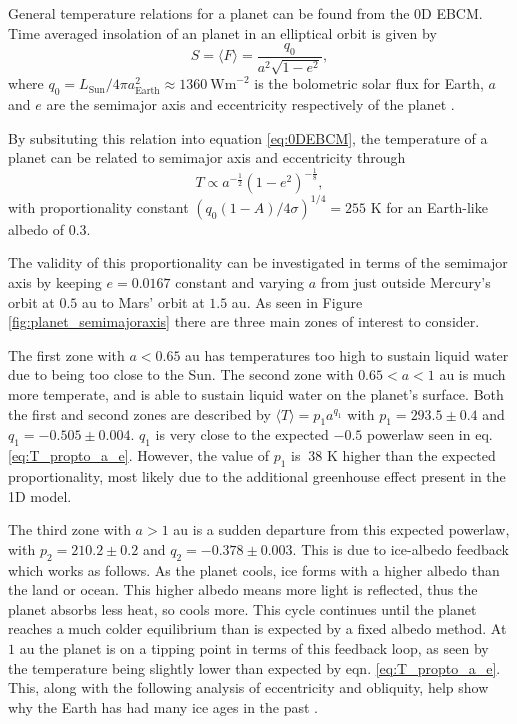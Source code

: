 \documentclass[12pt, onecolumn]{revtex4-2}    %
\begin{document}
General temperature relations for a planet can be found from the 0D EBCM.
Time averaged insolation of an planet in an elliptical orbit is given by
\begin{equation}
  S = \langle F \rangle = \frac{q_0}{a^2 \sqrt{1-e^2}} \label{eq:avgInsolation},
\end{equation}
where $q_0 = L_{\text{Sun}}/4\pi a_{\text{Earth}}^2 \approx 1360 \ \text{Wm}^{-2}$ is the bolometric solar flux for Earth, $a$ and $e$ are the semimajor axis and eccentricity respectively of the planet \cite{Mendez2017}.

By subsituting this relation into equation \eqref{eq:0DEBCM}, the temperature of a planet can be related to semimajor axis and eccentricity through
\begin{equation}
  T \propto a^{-\frac{1}{2}} (1-e^2)^{-\frac{1}{8}}, \label{eq:T_propto_a_e}
\end{equation}
with proportionality constant $(q_0 (1-A) / 4\sigma)^{1/4} = 255$ K for an Earth-like albedo of 0.3.


The validity of this proportionality can be investigated in terms of the semimajor axis by keeping $e = 0.0167$ constant and varying $a$ from just outside Mercury's orbit at $0.5$ au to Mars' orbit at $1.5$ au.
As seen in Figure \ref{fig:planet_semimajoraxis} there are three main zones of interest to consider.

The first zone with $a < 0.65$ au has temperatures too high to sustain liquid water due to being too close to the Sun.
The second zone with $0.65 < a < 1$ au is much more temperate, and is able to sustain liquid water on the planet's surface.
Both the first and second zones are described by $\langle T \rangle = p_1 a^{q_1}$ with $p_1 = 293.5 \pm 0.4$ and $q_1= -0.505 \pm 0.004$. $q_1$ is very close to the expected $-0.5$ powerlaw seen in eq. \eqref{eq:T_propto_a_e}.
However, the value of $p_1$ is $~38$ K higher than the expected proportionality, most likely due to the additional greenhouse effect present in the 1D model.

The third zone with $a > 1$ au is a sudden departure from this expected powerlaw, with $p_2 = 210.2 \pm 0.2$ and $q_2 = -0.378 \pm 0.003$.
This is due to ice-albedo feedback which works as follows.
As the planet cools, ice forms with a higher albedo than the land or ocean.
This higher albedo means more light is reflected, thus the planet absorbs less heat, so cools more.
This cycle continues until the planet reaches a much colder equilibrium than is expected by a fixed albedo method.
At $1$ au the planet is on a tipping point in terms of this feedback loop, as seen by the temperature being slightly lower than expected by eqn. \eqref{eq:T_propto_a_e}.
This, along with the following analysis of eccentricity and obliquity, help show why the Earth has had many ice ages in the past \cite{Emiliani78}.
\end{document}
